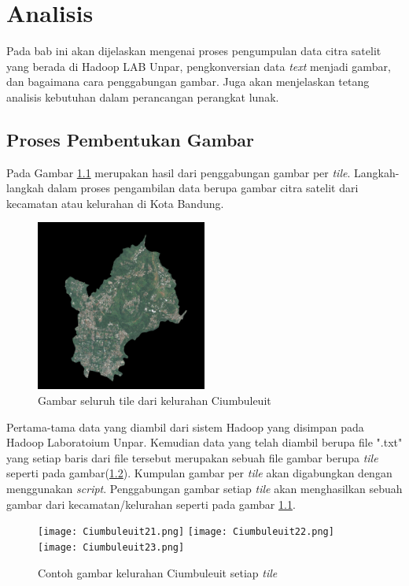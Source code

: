 \chapter{Analisis}
\label{chap:analisis}
Pada bab ini akan dijelaskan mengenai proses pengumpulan data citra satelit yang berada di Hadoop LAB Unpar, pengkonversian data \textit{text} menjadi gambar, dan bagaimana cara penggabungan gambar. Juga akan menjelaskan tetang analisis kebutuhan dalam perancangan perangkat lunak. 

\section{Proses Pembentukan Gambar}
Pada Gambar \ref{fig:ciumbuleuit} merupakan hasil dari penggabungan gambar per \textit{tile}. Langkah-langkah dalam proses pengambilan data berupa gambar citra satelit dari kecamatan atau kelurahan di Kota Bandung. 
\begin{figure}[H]
	\centering
	\includegraphics[width=0.5\textwidth]{Gambar/Ciumbuleuit.png}
	\caption{Gambar seluruh tile dari kelurahan Ciumbuleuit}
	\label{fig:ciumbuleuit}
\end{figure} 

Pertama-tama data yang diambil dari sistem Hadoop yang disimpan pada Hadoop Laboratoium Unpar. Kemudian data yang telah diambil berupa file ".txt" yang setiap baris dari file tersebut merupakan sebuah file gambar berupa \textit{tile} seperti pada gambar(\ref{fig:tileCiumbuleuit}). Kumpulan gambar per \textit{tile} akan digabungkan dengan menggunakan \textit{script}. Penggabungan gambar setiap \textit{tile} akan menghasilkan sebuah gambar dari kecamatan/kelurahan seperti pada gambar \ref{fig:ciumbuleuit}.
\begin{figure}[H]
	\centering
	\texttt{[image: Ciumbuleuit21.png]}
	\texttt{[image: Ciumbuleuit22.png]}
	\texttt{[image: Ciumbuleuit23.png]}
	\caption{Contoh gambar kelurahan Ciumbuleuit setiap \textit{tile}}
	\label{fig:tileCiumbuleuit}
\end{figure}

